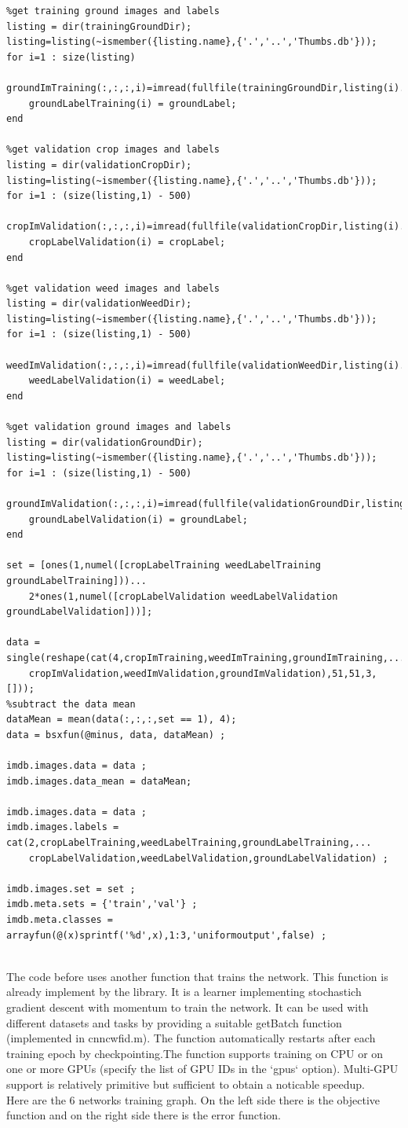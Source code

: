 \documentclass[]{report}
\begin{document}
\begin{lstlisting}
%get training ground images and labels
listing = dir(trainingGroundDir);
listing=listing(~ismember({listing.name},{'.','..','Thumbs.db'}));
for i=1 : size(listing)
    groundImTraining(:,:,:,i)=imread(fullfile(trainingGroundDir,listing(i).name));
    groundLabelTraining(i) = groundLabel;
end

%get validation crop images and labels
listing = dir(validationCropDir);
listing=listing(~ismember({listing.name},{'.','..','Thumbs.db'}));
for i=1 : (size(listing,1) - 500)
    cropImValidation(:,:,:,i)=imread(fullfile(validationCropDir,listing(i).name));
    cropLabelValidation(i) = cropLabel;
end

%get validation weed images and labels
listing = dir(validationWeedDir);
listing=listing(~ismember({listing.name},{'.','..','Thumbs.db'}));
for i=1 : (size(listing,1) - 500)
    weedImValidation(:,:,:,i)=imread(fullfile(validationWeedDir,listing(i).name));
    weedLabelValidation(i) = weedLabel;
end

%get validation ground images and labels
listing = dir(validationGroundDir);
listing=listing(~ismember({listing.name},{'.','..','Thumbs.db'}));
for i=1 : (size(listing,1) - 500)
    groundImValidation(:,:,:,i)=imread(fullfile(validationGroundDir,listing(i).name));
    groundLabelValidation(i) = groundLabel;
end

set = [ones(1,numel([cropLabelTraining weedLabelTraining groundLabelTraining]))...
    2*ones(1,numel([cropLabelValidation weedLabelValidation groundLabelValidation]))];

data = single(reshape(cat(4,cropImTraining,weedImTraining,groundImTraining,...
    cropImValidation,weedImValidation,groundImValidation),51,51,3,[]));
%subtract the data mean 
dataMean = mean(data(:,:,:,set == 1), 4);
data = bsxfun(@minus, data, dataMean) ;

imdb.images.data = data ;
imdb.images.data_mean = dataMean;

imdb.images.data = data ;
imdb.images.labels = cat(2,cropLabelTraining,weedLabelTraining,groundLabelTraining,...
    cropLabelValidation,weedLabelValidation,groundLabelValidation) ;

imdb.images.set = set ;
imdb.meta.sets = {'train','val'} ;
imdb.meta.classes = arrayfun(@(x)sprintf('%d',x),1:3,'uniformoutput',false) ;


\end{lstlisting}

The code before uses another function that trains the network. This function is already implement by the library. It is a learner implementing stochastich gradient descent with momentum to train the network. 
It can be used with different datasets and tasks by providing a suitable getBatch function (implemented in  cnn\textunderscore cwfid.m). The function automatically restarts after each training epoch by checkpointing.The function supports training on CPU or on one or more GPUs (specify the list of GPU IDs in the `gpus` option). Multi-GPU
support is relatively primitive but sufficient to obtain a noticable speedup.\\
Here are the 6 networks training graph. On the left side there is the objective function and on the right side there is the error function.
\end{document}
